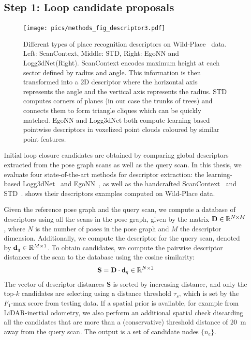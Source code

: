 \subsection*{\textbf{Step 1: Loop candidate proposals}}
\label{subsubsec:loop-candidate}
\begin{figure}[htbp]
  \centering
  \texttt{[image: pics/methods\_fig\_descriptor3.pdf]}
  \caption{Different types of place recognition descriptors on Wild-Place~\cite{knights2023icra} data. Left: ScanContext, Middle: STD, Right: EgoNN and Logg3dNet(Right). ScanContext encodes maximum height at each sector defined by radius and angle. This information is then transformed into a 2D descriptor where the horizontal axis represents the angle and the vertical axis represents the radius. STD computes corners of planes (in our case the trunks of trees) and connects them to form triangle cliques which can be quickly matched. EgoNN and Logg3dNet both compute learning-based pointwise descriptors in voxelized point clouds coloured by similar point features.}
  \label{fig:descriptors_example}
\end{figure}
Initial loop closure candidates are obtained by comparing global descriptors extracted from the pose graph scans as well as the query scan. In this thesis, we evaluate four state-of-the-art methods for descriptor extraction: the learning-based Logg3dNet~\cite{vidanapathirana2022icra} and EgoNN~\cite{komorowski2022ral}, as well as the handcrafted ScanContext~\cite{kim2018iros} and STD~\cite{yuan2023icra}.  shows their descriptors examples computed on Wild-Place data.  

Given the reference pose graph and the query scan, we compute a database of descriptors using all the scans in the pose graph, given by the matrix $\mathbf{D} \in \mathbb{R}^{N\times M}$, where $N$ is the number of poses in the pose graph and $M$ the descriptor dimension. Additionally, we compute the descriptor for the query scan, denoted by $\mathbf{d}_{q} \in \mathbb{R}^{M \times 1}$. 
To obtain candidates, we compute the pairwise descriptor distances of the scan to the database using the cosine similarity:
\begin{equation}
  \mathbf{S} = \mathbf{D} \cdot \mathbf{d}_{q} \in \mathbb{R}^{N \times 1}
\end{equation}
The vector of descriptor distances $\mathbf{S}$ is sorted by increasing distance, and only the top-$k$ candidates are selecting using a distance threshold $\tau_{s}$, which is set by the $F_1$-max score from testing data.
If a spatial prior is available, for example from LiDAR-inertial odometry, we also perform an additional spatial check discarding all the candidates that are more than a (conservative) threshold distance of \SI{20}{\meter} away from the query scan. The output is a set of candidate nodes $\{ n_c\}$.


